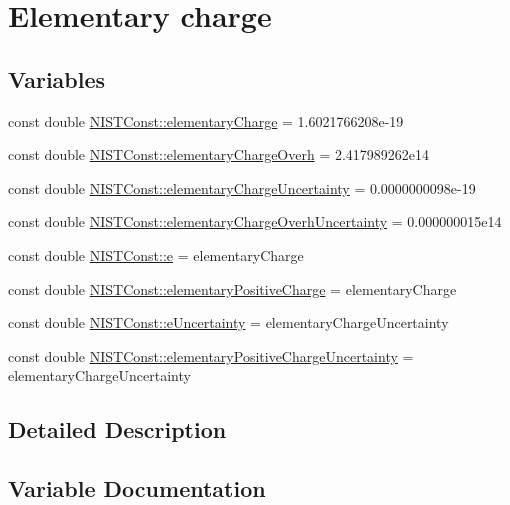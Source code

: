 \hypertarget{group___elementary_charge}{}\section{Elementary charge}
\label{group___elementary_charge}
\subsection*{Variables}
\begin{DoxyCompactItemize}
\item 
const double \hyperlink{group___elementary_charge_gaaa025a77a5281c83628ff8cb46f8038f}{N\+I\+S\+T\+Const\+::elementary\+Charge} = 1.\+6021766208e-\/19
\item 
const double \hyperlink{group___elementary_charge_ga262dea92054df909a97626e3c804f1b4}{N\+I\+S\+T\+Const\+::elementary\+Charge\+Overh} = 2.\+417989262e14
\item 
const double \hyperlink{group___elementary_charge_ga8e2ed13fe11bd4253e61c6f893a6778d}{N\+I\+S\+T\+Const\+::elementary\+Charge\+Uncertainty} = 0.\+0000000098e-\/19
\item 
const double \hyperlink{group___elementary_charge_gadc450d412ab46877fee4e29d8ccf7ce3}{N\+I\+S\+T\+Const\+::elementary\+Charge\+Overh\+Uncertainty} = 0.\+000000015e14
\item 
const double \hyperlink{group___elementary_charge_gad3e7e33fe20772dfbc4b39e433eb2f3a}{N\+I\+S\+T\+Const\+::e} = elementary\+Charge
\item 
const double \hyperlink{group___elementary_charge_ga1177663318bfe8bfa4b0c4fa489fbfb2}{N\+I\+S\+T\+Const\+::elementary\+Positive\+Charge} = elementary\+Charge
\item 
const double \hyperlink{group___elementary_charge_ga2c92e71a42a5f0e7facd87c2c15c0f2b}{N\+I\+S\+T\+Const\+::e\+Uncertainty} = elementary\+Charge\+Uncertainty
\item 
const double \hyperlink{group___elementary_charge_gab7ff4a358af518837d1e8f6fd6b26360}{N\+I\+S\+T\+Const\+::elementary\+Positive\+Charge\+Uncertainty} = elementary\+Charge\+Uncertainty
\end{DoxyCompactItemize}


\subsection{Detailed Description}


\subsection{Variable Documentation}
\mbox{\label{group___elementary_charge_gad3e7e33fe20772dfbc4b39e433eb2f3a}} 
